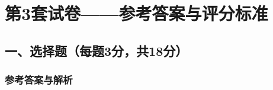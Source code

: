 \chapter{第3套试卷——参考答案与评分标准}

\usetikzlibrary{automata, positioning, arrows.meta}

\section{一、选择题（每题3分，共18分）}

\subsection*{参考答案与解析}

